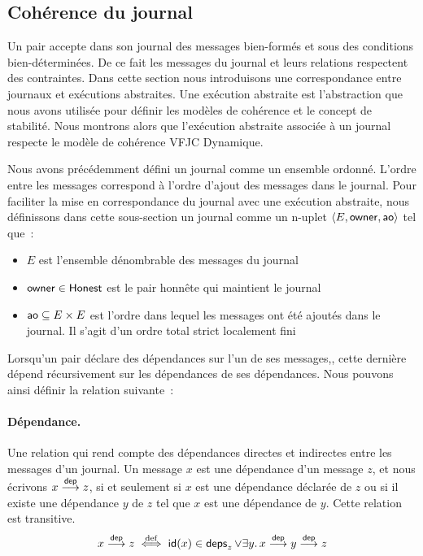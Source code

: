 \subsection{Cohérence du journal}

Un pair accepte dans son journal des messages bien-formés et sous des conditions bien-déterminées.
De ce fait les messages du journal et leurs relations respectent des contraintes.
Dans cette section nous introduisons une correspondance entre journaux et exécutions abstraites.
Une exécution abstraite est l'abstraction que nous avons utilisée pour définir les modèles de cohérence et le concept de stabilité.
Nous montrons alors que l'exécution abstraite associée à un journal respecte le modèle de cohérence \acl{VFJC} Dynamique.

Nous avons précédemment défini un journal comme un ensemble ordonné.
L'ordre entre les messages correspond à l'ordre d'ajout des messages dans le journal.
Pour faciliter la mise en correspondance du journal avec une exécution abstraite, nous définissons dans cette sous-section un journal comme un n-uplet $\tuple*{E, \trm{owner}, \trm{ao}}$ tel que~:
\begin{itemize}
    \item $E$ est l'ensemble dénombrable des messages du journal
    \item $\trm{owner} \in \trm{Honest}$ est le pair honnête qui maintient le journal
    \item $\trm{ao} \subseteq E \times E$ est l'ordre dans lequel les messages ont été ajoutés dans le journal.
    Il s'agit d'un ordre total strict localement fini
\end{itemize}

Lorsqu'un pair déclare des dépendances sur l'un de ses messages,, cette dernière dépend récursivement sur les dépendances de ses dépendances.
Nous pouvons ainsi définir la relation suivante~:

\paragraph{Dépendance.} Une relation qui rend compte des dépendances directes et indirectes entre les messages d'un journal.
Un message $x$ est une dépendance d'un message $z$, et nous écrivons $x \dep z$, si et seulement si $x$ est une dépendance déclarée de $z$ ou si il existe une dépendance $y$ de $z$ tel que $x$ est une dépendance de $y$.
Cette relation est transitive.
\begin{equation*}
    x \dep z \defiff \trm{id}(x) \in \trm{deps}_z \lor \exists y \qsep x \dep y \dep z
\end{equation*}

